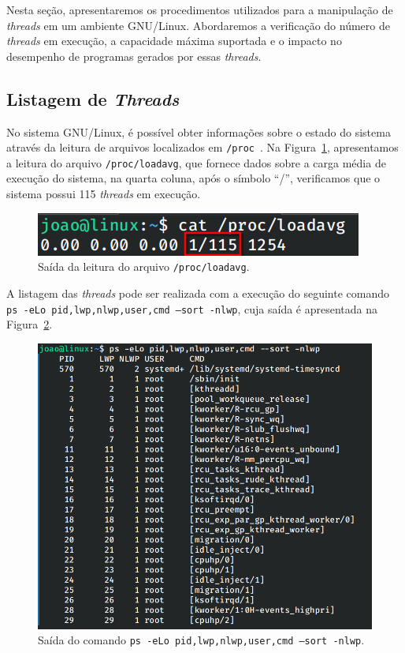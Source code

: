 \documentclass[
	12pt,				%
	oneside,   	        %
	a4paper,			%
	english,			%
	french,				%
	spanish,			%
	brazil,				%
	]{pacotes/abntex2}
\begin{document}
Nesta seção, apresentaremos os procedimentos utilizados para a manipulação de \textit{threads} em um ambiente GNU/Linux. Abordaremos a verificação do número de \textit{threads} em execução, a capacidade máxima suportada e o impacto no desempenho de programas gerados por essas \textit{threads}.

\subsection{Listagem de \textit{Threads}}
\label{subsec:list_threads}

No sistema GNU/Linux, é possível obter informações sobre o estado do sistema através da leitura de arquivos localizados em \texttt{/proc}~\cite{negus2012}. Na Figura~\ref{fig:total_tid}, apresentamos a leitura do arquivo \texttt{/proc/loadavg}, que fornece dados sobre a carga média de execução do sistema, na quarta coluna, após o símbolo ``/'', verificamos que o sistema possui 115 \textit{threads} em execução.

\begin{figure}[H]
  \centering
  \includegraphics[scale=0.45]{figuras/total_tid.png}
  \caption{Saída da leitura do arquivo \texttt{/proc/loadavg}.}
  \label{fig:total_tid}
\end{figure}

A listagem das \textit{threads} pode ser realizada com a execução do seguinte comando \texttt{ps -eLo pid,lwp,nlwp,user,cmd --sort -nlwp}, cuja saída é apresentada na Figura~\ref{fig:ps}.

\begin{figure}[H]
  \centering
  \includegraphics[scale=0.45]{figuras/ps.png}
  \caption{Saída do comando \texttt{ps -eLo pid,lwp,nlwp,user,cmd --sort -nlwp}.}
  \label{fig:ps}
\end{figure}
\end{document}
